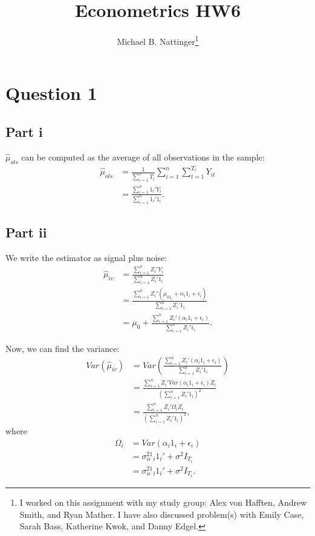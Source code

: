 \documentclass[11pt]{article} %
\title{Econometrics HW6}
\author{Michael B. Nattinger\footnote{I worked on this assignment with my study group: Alex von Hafften, Andrew Smith, and Ryan Mather. I have also discussed problem(s) with Emily Case, Sarah Bass, Katherine Kwok, and Danny Edgel.}}
\begin{document}
\maketitle

\section{Question 1}
\subsection{Part i}
$\hat{\mu}_{ols}$ can be computed as the average of all observations in the sample:
\begin{align*}
\hat{\mu}_{ols} &= \frac{1}{\sum_{i=1}^n T_i }\sum_{i=1}^n\sum_{t=1}^{T_i} Y_{it}\\
&= \frac{\sum_{i=1}^{n}1_{i}'Y_i}{\sum_{i=1}^{n}1_i'1_i}.
\end{align*}
\subsection{Part ii}
We write the estimator as signal plus noise:
\begin{align*}
\hat{\mu}_{iv} &= \frac{\sum_{i=1}^n Z_i'Y_i}{\sum_{i=1}^n Z_i'1_i}\\
&= \frac{\sum_{i=1}^n Z_i'(\mu_01_{i} + \alpha_i1_i + \epsilon_{i})}{\sum_{i=1}^n Z_i'1_i}\\
&= \mu_0 + \frac{\sum_{i=1}^n Z_i'(\alpha_i 1_i+ \epsilon_{i})}{\sum_{i=1}^n Z_i'1_i}.
\end{align*}

Now, we can find the variance:
\begin{align*}
Var(\hat{\mu}_{iv}) &= Var\left( \frac{\sum_{i=1}^n Z_i'(\alpha_i1_i + \epsilon_{i})}{\sum_{i=1}^n Z_i'1_i}\right)\\
&=   \frac{\sum_{i=1}^n Z_i'Var(\alpha_i1_i + \epsilon_{i})Z_i}{(\sum_{i=1}^n Z_i'1_i)^2}\\
&= \frac{\sum_{i=1}^n Z_i'\Omega_iZ_i}{(\sum_{i=1}^n Z_i'1_i)^2},
\end{align*}
where 
\begin{align*}
\Omega_i &= Var(\alpha_i1_i + \epsilon_{i})\\
&= \sigma_{\alpha}^21_i1_i' + \sigma^2I_{T_i}\\
&= \sigma_{\alpha}^21_i1_i' + \sigma^2I_{T_i}.
\end{align*}
\end{document}
